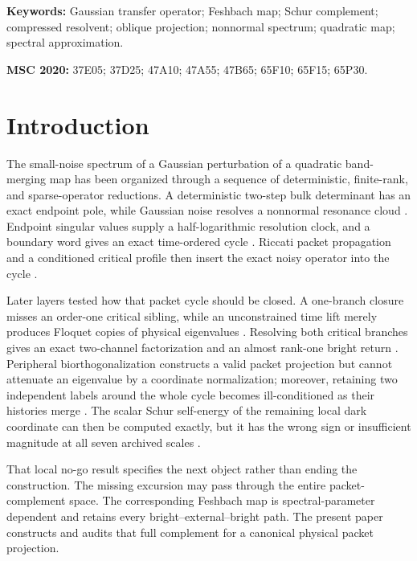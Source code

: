 \documentclass[11pt]{article}
\theoremstyle{definition}
\theoremstyle{remark}
\begin{document}
\noindent\textbf{Keywords:} Gaussian transfer operator; Feshbach map;
Schur complement; compressed resolvent; oblique projection; nonnormal
spectrum; quadratic map; spectral approximation.

\medskip
\noindent\textbf{MSC 2020:} 37E05; 37D25; 47A10; 47A55; 47B65; 65F10;
65F15; 65P30.

\section{Introduction}
\label{sec:introduction}

The small-noise spectrum of a Gaussian perturbation of a quadratic
band-merging map has been organized through a sequence of deterministic,
finite-rank, and sparse-operator reductions.  A deterministic two-step
bulk determinant has an exact endpoint pole, while Gaussian noise resolves
a nonnormal resonance cloud \citep{WangBulkScattering2026}.  Endpoint
singular values supply a half-logarithmic resolution clock, and a boundary
word gives an exact time-ordered cycle
\citep{WangEndpointRank2026,WangTimeOrdered2026}.  Riccati packet
propagation and a conditioned critical profile then insert the exact noisy
operator into the cycle \citep{WangGaussianReturn2026}.

Later layers tested how that packet cycle should be closed.  A one-branch
closure misses an order-one critical sibling, while an unconstrained time
lift merely produces Floquet copies of physical eigenvalues
\citep{WangComplement2026}.  Resolving both critical branches gives an exact
two-channel factorization and an almost rank-one bright return
\citep{WangSectorBranch2026}.  Peripheral biorthogonalization constructs a
valid packet projection but cannot attenuate an eigenvalue by a coordinate
normalization; moreover, retaining two independent labels around the whole
cycle becomes ill-conditioned as their histories merge
\citep{WangBiorthogonal2026}.  The scalar Schur self-energy of the remaining
local dark coordinate can then be computed exactly, but it has the wrong
sign or insufficient magnitude at all seven archived scales
\citep{WangDarkSchur2026}.

That local no-go result specifies the next object rather than ending the
construction.  The missing excursion may pass through the entire
packet-complement space.  The corresponding Feshbach map is
spectral-parameter dependent and retains every bright--external--bright
path.  The present paper constructs and audits that full complement for a
canonical physical packet projection.
\end{document}
